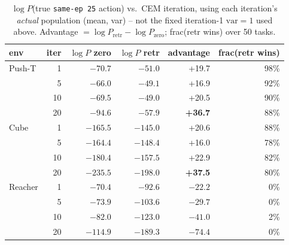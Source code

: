 \documentclass[11pt]{article}
\begin{document}
\begin{table}[H]
\centering\small
\caption{$\log P$(true \texttt{same-ep 25} action) vs.\ CEM iteration, using each iteration's
\emph{actual} population (mean, var) -- not the fixed iteration-1 $\mathrm{var}=1$ used above.
Advantage $=\log P_{\mathrm{retr}}-\log P_{\mathrm{zero}}$; frac(retr wins) over 50 tasks.}
\label{tab:retrieval-logp-iterations}
\begin{tabular}{lrrrrr}
\toprule
env & iter & $\log P$ zero & $\log P$ retr & advantage & frac(retr wins) \\
\midrule
Push-T  & 1  & $-70.7$  & $-51.0$  & +19.7 & 98\% \\
        & 5  & $-66.0$  & $-49.1$  & +16.9 & 92\% \\
        & 10 & $-69.5$  & $-49.0$  & +20.5 & 90\% \\
        & 20 & $-94.6$  & $-57.9$  & \textbf{+36.7} & 88\% \\
\midrule
Cube    & 1  & $-165.5$ & $-145.0$ & +20.6 & 88\% \\
        & 5  & $-164.4$ & $-148.4$ & +16.0 & 78\% \\
        & 10 & $-180.4$ & $-157.5$ & +22.9 & 82\% \\
        & 20 & $-235.5$ & $-198.0$ & \textbf{+37.5} & 80\% \\
\midrule
Reacher & 1  & $-70.4$  & $-92.6$  & $-22.2$ & 0\% \\
        & 5  & $-73.9$  & $-103.6$ & $-29.7$ & 0\% \\
        & 10 & $-82.0$  & $-123.0$ & $-41.0$ & 2\% \\
        & 20 & $-114.9$ & $-189.3$ & \textbf{$-74.4$} & 0\% \\
\bottomrule
\end{tabular}
\end{table}
\end{document}
